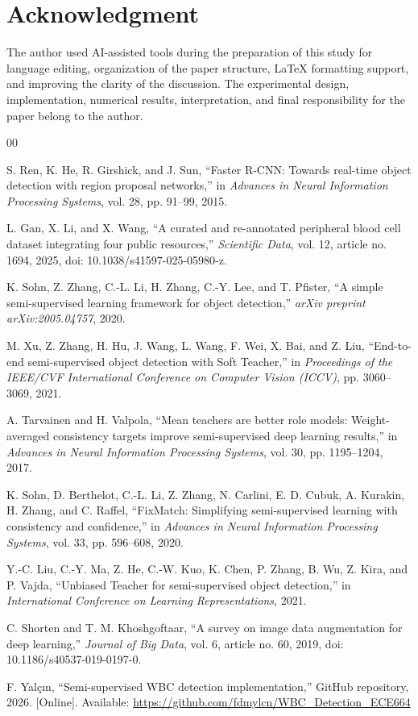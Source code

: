 \documentclass[conference,a4paper]{IEEEtran}
\begin{document}
\section*{Acknowledgment}
The author used AI-assisted tools during the preparation of this study for language editing, organization of the paper structure, LaTeX formatting support, and improving the clarity of the discussion. The experimental design, implementation, numerical results, interpretation, and final responsibility for the paper belong to the author.

\begin{thebibliography}{00}

S. Ren, K. He, R. Girshick, and J. Sun, ``Faster R-CNN: Towards real-time object detection with region proposal networks,'' in \textit{Advances in Neural Information Processing Systems}, vol. 28, pp. 91--99, 2015.

L. Gan, X. Li, and X. Wang, ``A curated and re-annotated peripheral blood cell dataset integrating four public resources,'' \textit{Scientific Data}, vol. 12, article no. 1694, 2025, doi: 10.1038/s41597-025-05980-z.

K. Sohn, Z. Zhang, C.-L. Li, H. Zhang, C.-Y. Lee, and T. Pfister, ``A simple semi-supervised learning framework for object detection,'' \textit{arXiv preprint arXiv:2005.04757}, 2020.

M. Xu, Z. Zhang, H. Hu, J. Wang, L. Wang, F. Wei, X. Bai, and Z. Liu, ``End-to-end semi-supervised object detection with Soft Teacher,'' in \textit{Proceedings of the IEEE/CVF International Conference on Computer Vision (ICCV)}, pp. 3060--3069, 2021.

A. Tarvainen and H. Valpola, ``Mean teachers are better role models: Weight-averaged consistency targets improve semi-supervised deep learning results,'' in \textit{Advances in Neural Information Processing Systems}, vol. 30, pp. 1195--1204, 2017.

K. Sohn, D. Berthelot, C.-L. Li, Z. Zhang, N. Carlini, E. D. Cubuk, A. Kurakin, H. Zhang, and C. Raffel, ``FixMatch: Simplifying semi-supervised learning with consistency and confidence,'' in \textit{Advances in Neural Information Processing Systems}, vol. 33, pp. 596--608, 2020.

Y.-C. Liu, C.-Y. Ma, Z. He, C.-W. Kuo, K. Chen, P. Zhang, B. Wu, Z. Kira, and P. Vajda, ``Unbiased Teacher for semi-supervised object detection,'' in \textit{International Conference on Learning Representations}, 2021.

C. Shorten and T. M. Khoshgoftaar, ``A survey on image data augmentation for deep learning,'' \textit{Journal of Big Data}, vol. 6, article no. 60, 2019, doi: 10.1186/s40537-019-0197-0.

F. Yal\c{c}\i n, ``Semi-supervised WBC detection implementation,'' GitHub repository, 2026. [Online]. Available: \url{https://github.com/fdmylcn/WBC_Detection_ECE664}

\end{thebibliography}
\end{document}
